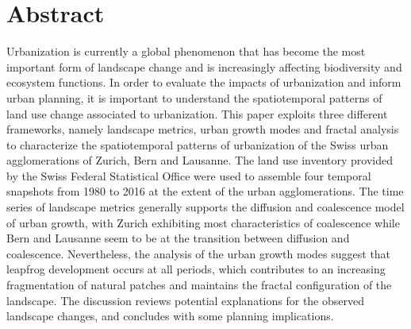 \documentclass[10pt,letterpaper]{article}
\begin{document}
\section*{Abstract}
Urbanization is currently a global phenomenon that has become the most important form of landscape change and is increasingly affecting biodiversity and ecosystem functions.
In order to evaluate the impacts of urbanization and inform urban planning, it is important to understand the spatiotemporal patterns of land use change associated to urbanization.
This paper exploits three different frameworks, namely landscape metrics, urban growth modes and fractal analysis to characterize the spatiotemporal patterns of urbanization of the Swiss urban agglomerations of Zurich, Bern and Lausanne.
The land use inventory provided by the Swiss Federal Statistical Office were used to assemble four temporal snapshots from 1980 to 2016 at the extent of the urban agglomerations.
The time series of landscape metrics generally supports the diffusion and coalescence model of urban growth, with Zurich exhibiting most characteristics of coalescence while Bern and Lausanne seem to be at the transition between diffusion and coalescence.
Nevertheless, the analysis of the urban growth modes suggest that leapfrog development occurs at all periods, which contributes to an increasing fragmentation of natural patches and maintains the fractal configuration of the landscape.
The discussion reviews potential explanations for the observed landscape changes, and concludes with some planning implications.
\end{document}

